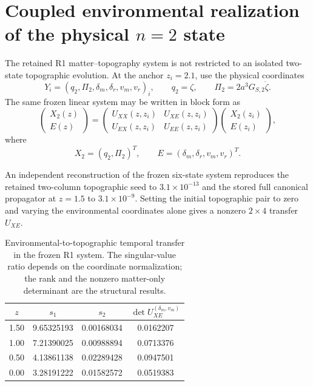 
\section{Coupled environmental realization of the physical $n=2$ state}
\label{sec:coupled-environmental-state}

The retained R1 matter--topography system is not restricted to an isolated
two-state topographic evolution.  At the anchor $z_i=2.1$, use the physical
coordinates
\begin{equation}
Y_i=
\left(
q_2,\Pi_2,
\delta_m,\delta_r,v_m,v_r
\right)_i ,
\qquad
q_2=\zeta,
\qquad
\Pi_2=2a^3G_{S,2}\dot\zeta .
\end{equation}
The same frozen linear system may be written in block form as
\begin{equation}
\begin{pmatrix}
X_2(z)\\
E(z)
\end{pmatrix}
=
\begin{pmatrix}
U_{XX}(z,z_i) & U_{XE}(z,z_i)\\
U_{EX}(z,z_i) & U_{EE}(z,z_i)
\end{pmatrix}
\begin{pmatrix}
X_2(z_i)\\
E(z_i)
\end{pmatrix},
\end{equation}
where
\begin{equation}
X_2=(q_2,\Pi_2)^T,
\qquad
E=(\delta_m,\delta_r,v_m,v_r)^T .
\end{equation}

An independent reconstruction of the frozen six-state system reproduces the
retained two-column topographic seed to $3.1\times10^{-13}$ and the stored
full canonical propagator at $z=1.5$ to $3.1\times10^{-9}$.  Setting the
initial topographic pair to zero and varying the environmental coordinates
alone gives a nonzero $2\times4$ transfer $U_{XE}$.

\begin{table}[H]
\centering
\caption{Environmental-to-topographic temporal transfer in the frozen R1
system.  The singular-value ratio depends on the coordinate normalization;
the rank and the nonzero matter-only determinant are the structural results.}
\begin{tabular}{cccc}
\toprule
$z$ & $s_1$ & $s_2$ &
$\det U_{XE}^{(\delta_m,v_m)}$\\
\midrule
1.50 & 9.65325193 & 0.00168034 & 0.0162207\\
1.00 & 7.21390025 & 0.00988894 & 0.0713376\\
0.50 & 4.13861138 & 0.02289428 & 0.0947501\\
0.00 & 3.28191222 & 0.01582572 & 0.0519383\\
\bottomrule
\end{tabular}
\end{table}

